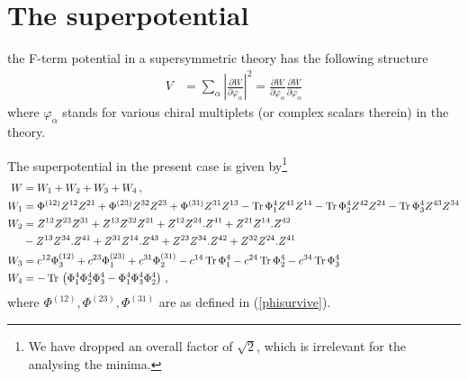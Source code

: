 \documentclass[12pt,a4paper]{JHEP3}
\newcommand{\refb}[1]{(\ref{#1})}
\newcommand{\Tr}{\mathop{\mathrm{Tr}}}
\newcommand{\nn}{\ensuremath{\nonumber{}}}
\begin{document}
%

\section{The superpotential} \label{appsup}
the F-term potential in a supersymmetric theory has the following structure
\begin{align}
V &= \sum_\alpha \left| \frac{\partial W}{\partial \varphi_\alpha} \right|^2 = \frac{\partial W}{\partial \varphi_\alpha}  \frac{\partial \overline{W}}{\partial \overline{\varphi_\alpha}} 
\end{align}
where $\varphi_\alpha$ stands for various chiral multiplets (or complex scalars therein) in the theory. 

The superpotential in the present case is given by\footnote{We have dropped an overall factor of $\sqrt{2}$, which is  irrelevant for the analysing the minima.} \cite{Chowdhury:2015gbk}
\begin{align}
\nn
W &= W_1 + W_2 + W_3 + W_4 \, , \\ 
\nn
W_1 &= \Phi^{(12)} Z^{12} Z^{21} + \Phi^{(23)} Z^{32} Z^{23} + \Phi^{(31)} Z^{31} Z^{13} - \Tr{} \Phi^{4}_1 Z^{41} Z^{14} - \Tr{} \Phi^{4}_2 Z^{42} Z^{24} - \Tr{} \Phi^{4}_3 Z^{43} Z^{34} \\
\nn
W_2 &= Z^{12} Z^{23} Z^{31} +  Z^{13} Z^{32} Z^{21} + Z^{12} Z^{24}. Z^{41}  +  Z^{21} Z^{14}. Z^{42}  \\
\nn
&-  Z^{13} Z^{34}. Z^{41}  +  Z^{31} Z^{14} . Z^{43}  +  Z^{23} Z^{34} . Z^{42}  + Z^{32} Z^{24} . Z^{41} \\
\nn
W_3 &= c^{12} \Phi^{(12)}_3 + c^{23} \Phi^{(23)}_1 + c^{31} \Phi^{(31)}_2 - c^{14} \Tr{} \Phi_1^{4} - c^{24} \Tr{} \Phi_2^{4} - c^{34} \Tr{} \Phi_3^{4} \\
W_4 &= - \Tr{} \left( \Phi^{4}_1 \Phi^{4}_2 \Phi^{4}_3 -   \Phi^{4}_1 \Phi^{4}_3 \Phi^{4}_2 \right) \, , 
\end{align}
where $ \Phi^{(12)},  \Phi^{(23)},  \Phi^{(31)}$ are as defined in \refb{phisurvive}.
\end{document}
